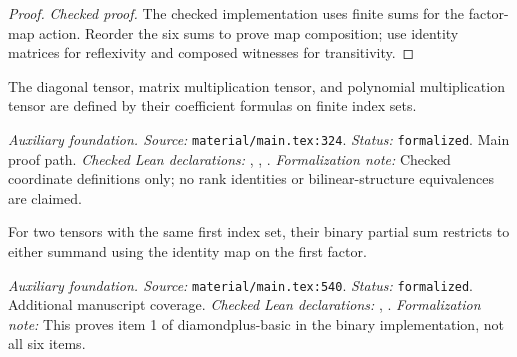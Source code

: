 \begin{proof}
\leanok
\textit{Checked proof.} The checked implementation uses finite sums for the factor-map action. Reorder the six sums to prove map composition; use identity matrices for reflexivity and composed witnesses for transitivity.
\end{proof}

\renewcommand{\thetheorem}{A16}
\begin{definition}
\label{aux:explicit-tensor-definitions}
\leanok
{}
The diagonal tensor, matrix multiplication tensor, and polynomial multiplication tensor are defined by their coefficient formulas on finite index sets.
\end{definition}

\noindent\textit{Auxiliary foundation. Source:} \texttt{material/main.tex:324}.
\textit{Status:} \texttt{formalized}. Main proof path.
\textit{Checked Lean declarations:} , , .
\textit{Formalization note:} Checked coordinate definitions only; no rank identities or bilinear-structure equivalences are claimed.

\renewcommand{\thetheorem}{A17}
\begin{lemma}
\label{aux:binary-partial-sum-projections}
\leanok
For two tensors with the same first index set, their binary partial sum restricts to either summand using the identity map on the first factor.
\end{lemma}

\noindent\textit{Auxiliary foundation. Source:} \texttt{material/main.tex:540}.
\textit{Status:} \texttt{formalized}. Additional manuscript coverage.
\textit{Checked Lean declarations:} , .
\textit{Formalization note:} This proves item 1 of diamondplus-basic in the binary implementation, not all six items.

